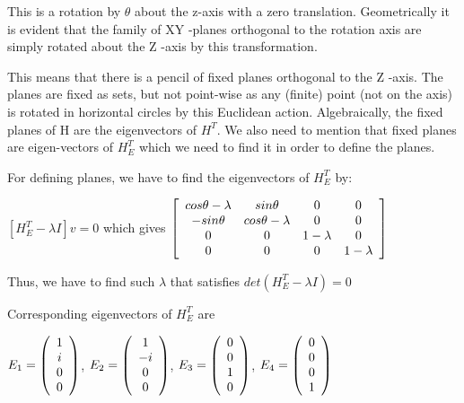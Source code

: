 \documentclass[]{article}
\begin{document}
This is a rotation by $ \theta $ about the z-axis with a zero translation. Geometrically it is evident that the family of XY -planes orthogonal to the rotation axis are simply rotated about the Z -axis by this transformation.

This means that there is a pencil of fixed planes orthogonal to the Z -axis. The planes
are fixed as sets, but not point-wise as any (finite) point (not on the axis) is rotated in horizontal circles by this Euclidean action. Algebraically, the fixed planes of H are the eigenvectors of $H^T$. We also need to mention that fixed planes are eigen-vectors of $H_E^T$ which we need to find it in order to define the planes. 

For defining planes, we have to find the eigenvectors of $H_E^T$ by:

\vspace{0.5em}

\centerline {
	$[H_E^T - \lambda I]v = 0 $ which gives $\left[ {\begin{array}{*{20}c}
		cos \theta - \lambda & sin \theta & 0 & 0 \\
		-sin \theta & cos \theta - \lambda & 0 & 0 \\ 
		0 & 0 & 1 - \lambda & 0 \\ 
		0 & 0 & 0 & 1 - \lambda   
		\end{array} } \right] $
}

\vspace{0.5em}

Thus, we have to find such $\lambda$ that satisfies $det(H_E^T - \lambda I) = 0$

\vspace{0.5em}

Corresponding eigenvectors of $H_E^T$ are 

\vspace{0.5em}

\centerline {
	$E_1 = \left( {\begin{array}{*{20}c}
		1 \\
		i \\ 
		0 \\
		0   
		\end{array} } \right)$, $E_2 = \left( {\begin{array}{*{20}c}
		1 \\
		-i \\ 
		0 \\
		0   
		\end{array} } \right)$, 	$E_3 = \left( {\begin{array}{*{20}c}
		0 \\
		0 \\ 
		1 \\
		0   
		\end{array} } \right)$, 	$E_4 = \left( {\begin{array}{*{20}c}
		0 \\
		0 \\ 
		0 \\
		1   
		\end{array} } \right)$
}
\end{document}
